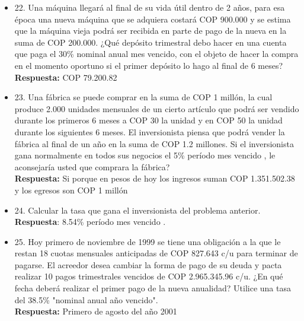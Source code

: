 \begin{itemize}
 \item 22. Una máquina llegará al final de su vida útil dentro de 2 años, para esa época una nueva máquina que se adquiera costará COP 900.000 y se estima que la máquina vieja podrá ser recibida en parte de pago de la nueva en la suma de COP 200.000. ¿Qué depósito trimestral debo hacer en una cuenta que paga el 30\% nominal anual mes vencido, con el objeto de hacer la compra en el momento oportuno si el primer depósito lo hago al final de 6 meses?\\
       \textbf{Respuesta:} COP 79.200.82\\
       \medskip

 \item 23. Una fábrica se puede comprar en la suma de COP 1 millón, la cual produce 2.000 unidades mensuales de un cierto artículo que podrá ser vendido durante los primeros 6 meses a COP 30 la unidad y en COP 50 la unidad durante los siguientes 6 meses. El inversionista piensa que podrá vender la fábrica al final de un año en la suma de COP 1.2 millones. Si el inversionista gana normalmente en todos sus negocios el 5\% período mes vencido , le aconsejaría usted que comprara la fábrica?\\
       \textbf{Respuesta:} Si porque en pesos de hoy los ingresos suman COP 1.351.502.38 y los egresos son COP 1 millón\\
       \medskip

 \item 24. Calcular la tasa que gana el inversionista del problema anterior.\\
       \textbf{Respuesta}: 8.54\% período mes vencido .\\
       \medskip

 \item 25. Hoy primero de noviembre de 1999 se tiene una obligación a la que le restan 18 cuotas mensuales anticipadas de COP 827.643 c/u para terminar de pagarse. El acreedor desea cambiar la forma de pago de su deuda y pacta realizar 10 pagos trimestrales vencidos de COP 2.965.345.96 c/u. ¿En qué fecha deberá realizar el primer pago de la nueva anualidad? Utilice una tasa del 38.5\% "nominal anual año vencido".\\
       \textbf{Respuesta:} Primero de agosto del año 2001\\
       \medskip


\end{itemize}
